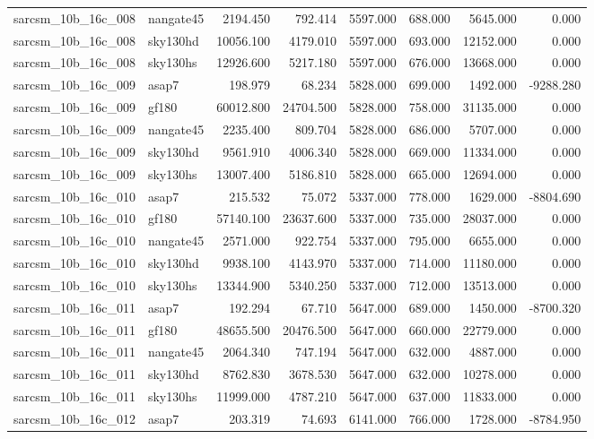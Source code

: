\begin{tabular}{llrrrrrr}
sarcsm\_10b\_16c\_008 & nangate45 & 2194.450 & 792.414 & 5597.000 & 688.000 & 5645.000 & 0.000 \\
sarcsm\_10b\_16c\_008 & sky130hd & 10056.100 & 4179.010 & 5597.000 & 693.000 & 12152.000 & 0.000 \\
sarcsm\_10b\_16c\_008 & sky130hs & 12926.600 & 5217.180 & 5597.000 & 676.000 & 13668.000 & 0.000 \\
sarcsm\_10b\_16c\_009 & asap7 & 198.979 & 68.234 & 5828.000 & 699.000 & 1492.000 & -9288.280 \\
sarcsm\_10b\_16c\_009 & gf180 & 60012.800 & 24704.500 & 5828.000 & 758.000 & 31135.000 & 0.000 \\
sarcsm\_10b\_16c\_009 & nangate45 & 2235.400 & 809.704 & 5828.000 & 686.000 & 5707.000 & 0.000 \\
sarcsm\_10b\_16c\_009 & sky130hd & 9561.910 & 4006.340 & 5828.000 & 669.000 & 11334.000 & 0.000 \\
sarcsm\_10b\_16c\_009 & sky130hs & 13007.400 & 5186.810 & 5828.000 & 665.000 & 12694.000 & 0.000 \\
sarcsm\_10b\_16c\_010 & asap7 & 215.532 & 75.072 & 5337.000 & 778.000 & 1629.000 & -8804.690 \\
sarcsm\_10b\_16c\_010 & gf180 & 57140.100 & 23637.600 & 5337.000 & 735.000 & 28037.000 & 0.000 \\
sarcsm\_10b\_16c\_010 & nangate45 & 2571.000 & 922.754 & 5337.000 & 795.000 & 6655.000 & 0.000 \\
sarcsm\_10b\_16c\_010 & sky130hd & 9938.100 & 4143.970 & 5337.000 & 714.000 & 11180.000 & 0.000 \\
sarcsm\_10b\_16c\_010 & sky130hs & 13344.900 & 5340.250 & 5337.000 & 712.000 & 13513.000 & 0.000 \\
sarcsm\_10b\_16c\_011 & asap7 & 192.294 & 67.710 & 5647.000 & 689.000 & 1450.000 & -8700.320 \\
sarcsm\_10b\_16c\_011 & gf180 & 48655.500 & 20476.500 & 5647.000 & 660.000 & 22779.000 & 0.000 \\
sarcsm\_10b\_16c\_011 & nangate45 & 2064.340 & 747.194 & 5647.000 & 632.000 & 4887.000 & 0.000 \\
sarcsm\_10b\_16c\_011 & sky130hd & 8762.830 & 3678.530 & 5647.000 & 632.000 & 10278.000 & 0.000 \\
sarcsm\_10b\_16c\_011 & sky130hs & 11999.000 & 4787.210 & 5647.000 & 637.000 & 11833.000 & 0.000 \\
sarcsm\_10b\_16c\_012 & asap7 & 203.319 & 74.693 & 6141.000 & 766.000 & 1728.000 & -8784.950 \\

\end{tabular}
